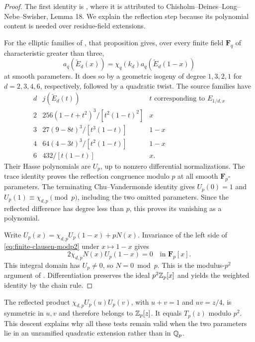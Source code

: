\begin{proof}
The first identity is \cite[\S7, equation (7.4)]{BRSTT}, where it
is attributed to Chisholm--Deines--Long--Nebe--Swisher, Lemma 18.
We explain the reflection step because its polynomial content is
needed over residue-field extensions.

For the elliptic families of \cite[Proposition 7.1]{BRSTT}, that
proposition gives, over every finite field $\mathbf F_q$ of
characteristic greater than three,
\[
       a_q(\widetilde E_d(x))
         =\chi_q(k_d)a_q(\widetilde E_d(1-x))
\]
at smooth parameters.  It does so by a geometric isogeny of degree
$1,3,2,1$ for $d=2,3,4,6$, respectively, followed by a quadratic
twist.  The source families have
\[
\begin{array}{c|c|c}
 d&j(\widetilde E_d(t))&t\text{ corresponding to }E_{1/d,x}\\\hline
 2&256(1-t+t^2)^3/[t^2(1-t)^2]&x\\
 3&27(9-8t)^3/[t^3(1-t)]&1-x\\
 4&64(4-3t)^3/[t^2(1-t)]&1-x\\
 6&432/[t(1-t)]&x.
\end{array}
\]
Their Hasse polynomials are $U_p$, up to nonzero differential
normalizations.  The trace identity proves the reflection
congruence modulo $p$ at all smooth $\mathbf F_p$-parameters.
The terminating Chu--Vandermonde identity gives
$U_p(0)=1$ and $U_p(1)\equiv\chi_{d,p}\pmod p$, including the
two omitted parameters.  Since the reflected difference has
degree less than $p$, this proves its vanishing as a polynomial.

Write $U_p(x)=\chi_{d,p}U_p(1-x)+pN(x)$.  Invariance of the
left side of \eqref{eq:finite-clausen-modp2} under $x\mapsto1-x$
gives
\[
                      2\chi_{d,p}N(x)U_p(1-x)=0
                              \quad\text{in }\mathbf F_p[x].
\]
This integral domain has $U_p\ne0$, so $N=0\bmod p$.
This is the modulus-$p^2$ argument of \cite[Lemma 7.2]{BRSTT}.
Differentiation preserves the ideal $p^2\mathbb Z_p[x]$ and yields
the weighted identity by the chain rule.
\end{proof}
The reflected product
$\chi_{d,p}U_p(u)U_p(v)$, with $u+v=1$ and $uv=z/4$, is
symmetric in $u,v$ and therefore belongs to $\mathbb Z_p[z]$.
It equals $T_p(z)$ modulo $p^2$.  This descent explains why all
these tests remain valid when the two parameters lie in an
unramified quadratic extension rather than in $\mathbb Q_p$.

